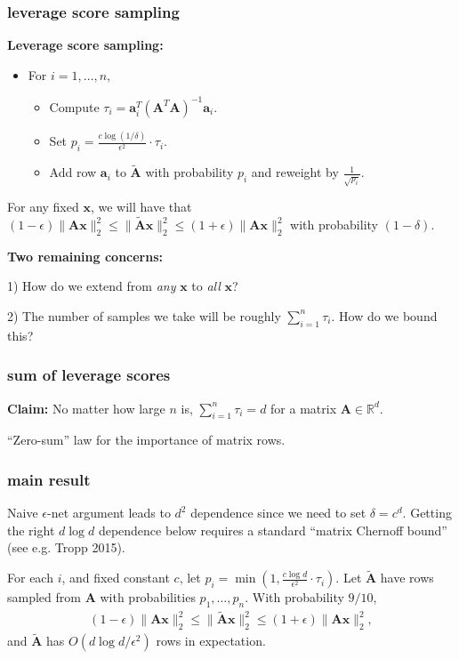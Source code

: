 \documentclass[compress]{beamer}
\newcommand{\bv}[1]{\mathbf{#1}}
\newcommand{\R}{\mathbb{R}}
\begin{document}
\begin{frame}[t]
	\frametitle{leverage score sampling}
	\textbf{Leverage score sampling:}
	\begin{itemize}
		\item For $i = 1, \ldots, n$, 
		\begin{itemize}
			\item Compute $\tau_i = \bv{a}_i^T(\bv{A}^T\bv{A})^{-1}\bv{a}_i$. 
			\item Set $p_i = \frac{c\log(1/\delta)}{\epsilon^2}\cdot \tau_i$.
			\item Add row $\bv{a}_i$ to $\tilde{\bv{A}}$ with probability $p_i$ and reweight by $\frac{1}{\sqrt{p_i}}$.  			
		\end{itemize}
	\end{itemize}
	For any fixed $\bv{x}$, we will have that $(1-\epsilon) \|{\bv{A}}\bv{x}\|_2^2\leq \|\tilde{\bv{A}}\bv{x}\|_2^2 \leq (1+\epsilon) \|{\bv{A}}\bv{x}\|_2^2$ with probability $(1-\delta)$. 
	
	\textbf{Two remaining concerns:}
	
	1) How do we extend from \emph{any} $\bv{x}$ to \emph{all} $\bv{x}$?
	
	2) The number of samples we take will be roughly $\sum_{i=1}^n \tau_i$. How do we bound this?
\end{frame}


\begin{frame}[t]
	\frametitle{sum of leverage scores}
	\textbf{Claim:} No matter how large $n$ is, $\sum_{i=1}^n \tau_i = d$ for a matrix $\bv{A}\in \R^d$. 
	
	
	\vspace{12em}
	\begin{center}
		\alert{``Zero-sum'' law for the importance of matrix rows.}
	\end{center}
\end{frame}


\begin{frame}[t]
	\frametitle{main result}
	Naive $\epsilon$-net argument leads to $d^2$ dependence since we need to set $\delta = c^d$. Getting the right $d\log d$ dependence below requires a standard ``matrix Chernoff bound'' (see e.g. Tropp 2015). 
	\begin{theorem}
		For each $i$, and fixed constant $c$, let $p_i = \min\left(1,\frac{c\log d}{\epsilon^2}\cdot \tau_i\right)$.
		Let ${\tilde{\bv{A}}}$ have rows sampled from $\bv{A}$ with probabilities $p_1, \ldots, p_n$. With probability $9/10$, 
		\begin{align*}
			(1-\epsilon)\|\bv{A}\bv{x}\|_2^2 \leq \|\tilde{\bv{A}} \bv{x}\|_2^2 \leq	(1+\epsilon)\|\bv{A}\bv{x}\|_2^2,
		\end{align*}
		and ${\tilde{\bv{A}}}$ has $O(d\log d/\epsilon^2)$ rows in expectation. 
	\end{theorem}
\end{frame}
\end{document}
